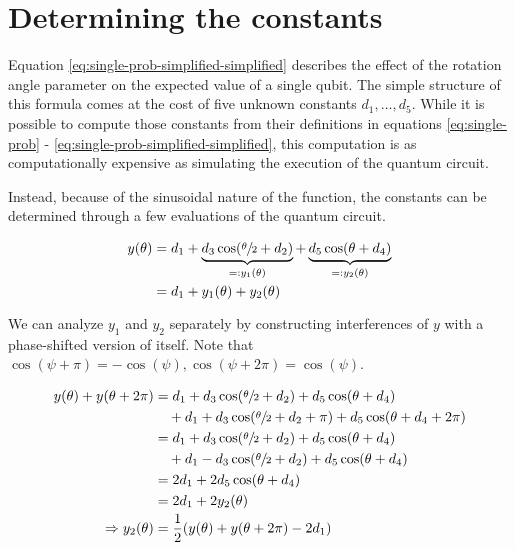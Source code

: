 \section{Determining the constants}
\label{sec:constants}
Equation \ref{eq:single-prob-simplified-simplified} describes the effect of the
rotation angle parameter on the expected value of a single qubit.
The simple structure of this formula comes at the cost of five unknown
constants $d_1, \dots, d_5$.
While it is possible to compute those constants from their definitions in
equations \ref{eq:single-prob} - \ref{eq:single-prob-simplified-simplified},
this computation is as computationally expensive as simulating the execution of
the quantum circuit.

Instead, because of the sinusoidal nature of the function, the constants can be
determined through a few evaluations of the quantum circuit.

\begin{equation}
    \label{eq:y}
    \begin{split}
        y(\theta)
            &= d_1 + \underbrace{d_3 \cos(\sfrac\theta2 + d_2)}_{=: y_1(\theta)} + \underbrace{d_5 \cos(\theta + d_4)}_{=: y_2(\theta)}\\
            &= d_1 + y_1(\theta) + y_2(\theta)
    \end{split}
\end{equation}

We can analyze $y_1$ and $y_2$ separately by constructing interferences of $y$
with a phase-shifted version of itself.
Note that
$\cos(\psi + \pi) = -\cos(\psi), \cos(\psi + 2\pi) = \cos(\psi)$.

\begin{equation}
    \label{eq:d1+y2}
    \begin{split}
        y(\theta) + y(\theta + 2\pi)
            &= d_1 + d_3 \cos(\sfrac\theta2 + d_2) + d_5 \cos(\theta + d_4)\\
                &\quad + d_1 + d_3 \cos(\sfrac\theta2 + d_2 + \pi) + d_5 \cos(\theta + d_4 + 2\pi)\\
            &= d_1 + d_3 \cos(\sfrac\theta2 + d_2) + d_5 \cos(\theta + d_4)\\
                &\quad + d_1 - d_3 \cos(\sfrac\theta2 + d_2) + d_5 \cos(\theta + d_4)\\
            &= 2 d_1 + 2 d_5 \cos(\theta + d_4)\\
            &= 2 d_1 + 2 y_2(\theta)\\
        \Rightarrow y_2(\theta) &= \frac12 (y(\theta) + y(\theta + 2\pi) - 2 d_1)
    \end{split}
\end{equation}

